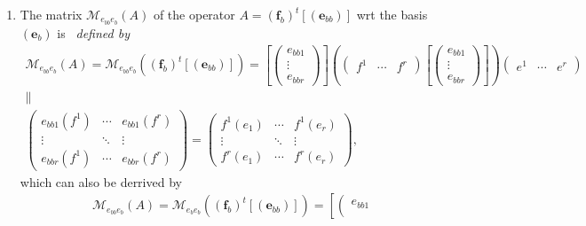 \documentclass[aps,preprint]{revtex4}
\begin{document}
\begin{enumerate}
\begin{enumerate}
\item The matrix $\mathcal{M}_{e_{bb}e_{b}}\left( A\right) $ of the operator 
$A=\left( \boldsymbol{f}_{b}\right) ^{t}\left[ \left( \boldsymbol{e}%
_{bb}\right) \right] $ wrt the basis $\left( \boldsymbol{e}_{b}\right) $ is%
\emph{\ defined by} 
\begin{gather}
\mathcal{M}_{e_{bb}e_{b}}\left( A\right) =\mathcal{M}_{e_{bb}e_{b}}\left(
\left( \boldsymbol{f}_{b}\right) ^{t}\left[ \left( \boldsymbol{e}%
_{bb}\right) \right] \right) =\left[ \left( 
\begin{array}{c}
e_{bb1} \\ 
\vdots \\ 
e_{bbr}%
\end{array}%
\right) \right] \left( \left( 
\begin{array}{ccc}
f^{1} & \cdots & f^{r}%
\end{array}%
\right) \left[ \left( 
\begin{array}{c}
e_{bb1} \\ 
\vdots \\ 
e_{bbr}%
\end{array}%
\right) \right] \right) \left( 
\begin{array}{ccc}
e^{1} & \cdots & e^{r}%
\end{array}%
\right) \\
\parallel \\
\left( 
\begin{array}{ccc}
e_{bb1}\left( f^{1}\right) & \cdots & e_{bb1}\left( f^{r}\right) \\ 
\vdots & \ddots & \vdots \\ 
e_{bbr}\left( f^{1}\right) & \cdots & e_{bbr}\left( f^{r}\right)%
\end{array}%
\right) =\left( 
\begin{array}{ccc}
f^{1}\left( e_{1}\right) & \cdots & f^{1}\left( e_{r}\right) \\ 
\vdots & \ddots & \vdots \\ 
f^{r}\left( e_{1}\right) & \cdots & f^{r}\left( e_{r}\right)%
\end{array}%
\right) ,
\end{gather}%
which can also be derrived by 
\begin{gather}
\mathcal{M}_{e_{bb}e_{b}}\left( A\right) =\mathcal{M}_{e_{b}e_{b}}\left(
\left( \boldsymbol{f}_{b}\right) ^{t}\left[ \left( \boldsymbol{e}%
_{bb}\right) \right] \right) =\left[ \left( 
\begin{array}{c}
e_{bb1} \\ 

\end{array}
\end{gather}
\end{enumerate}
\end{enumerate}
\end{document}
